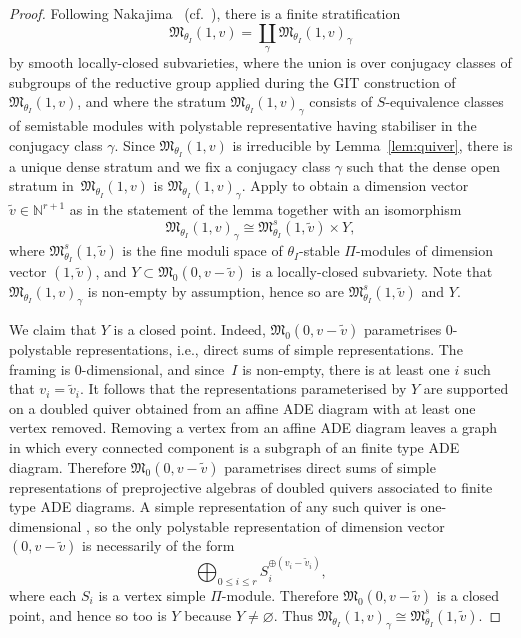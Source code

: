 \documentclass[11pt]{article}
\numberwithin{equation}{section}
\numberwithin{equation}{section}
\begin{document}
\begin{proof}
 Following Nakajima~\cite[Section 6]{nakajima1994instantons} (cf.\ \cite[Section 3.5]{bellamy2020birational}),
 there is a finite stratification
\begin{equation*}
\mathfrak{M}_{\theta_I}(1,v) = \coprod_{\gamma} \mathfrak{M}_{\theta_I}(1,v)_{\gamma} \end{equation*}
by smooth locally-closed subvarieties, where the union is over conjugacy classes of subgroups of the reductive group applied during the GIT construction of $\mathfrak{M}_{\theta_I}(1,v)$, and where the stratum $\mathfrak{M}_{\theta_I}(1,v)_{\gamma}$ consists of $S$-equivalence classes of semistable modules with polystable representative having stabiliser in the conjugacy class $\gamma$. Since $\mathfrak{M}_{\theta_I}(1,v)$ is irreducible by Lemma~\ref{lem:quiver}, there is a unique dense stratum and we fix a conjugacy class $\gamma$
 such that the dense open stratum in~$\mathfrak{M}_{\theta_I}(1,v)$ is $\mathfrak{M}_{\theta_I}(1,v)_\gamma$. Apply \cite[Proposition 2.25]{nakajima2009quiver} to obtain a dimension vector $\widetilde{v}\in \mathbb{N}^{r+1}$ as in the statement of the lemma
 together with an isomorphism
\begin{equation} \label{eqn:gammaIsom}
\mathfrak{M}_{\theta_I}(1,v)_{\gamma} \cong \mathfrak{M}^s_{\theta_I}(1,\widetilde{v}) \times {Y},
\end{equation}
 where $\mathfrak{M}^s_{\theta_I}(1,\widetilde{v})$ is the fine moduli space of $\theta_I$-stable $\Pi$-modules of dimension vector $(1,\widetilde{v})$, and ${Y} \subset \mathfrak{M}_{0}(0,v-\widetilde{v})$ is a locally-closed subvariety.
 Note that $\mathfrak{M}_{\theta_I}(1,v)_{\gamma}$ is non-empty by assumption, hence so are $\mathfrak{M}^s_{\theta_I}(1,\widetilde{v})$ and ${Y}$.

 We claim that ${Y}$ is a closed point. Indeed, $\mathfrak{M}_0(0, v-\widetilde{v})$ parametrises
 0-polystable representations, i.e., direct sums of simple representations. The framing is 0-dimensional,
and since~$I$ is non-empty, there is at least one $i$ such that $v_i = \widetilde{v}_i$. It follows that the representations parameterised by ${Y}$
are supported on a doubled quiver obtained from an affine ADE diagram with at least one vertex removed. Removing a vertex from an affine ADE diagram leaves a graph in which every connected component is a subgraph of an finite type ADE diagram. Therefore $\mathfrak{M}_0(0, v-\widetilde{v})$ parametrises direct sums of simple representations of preprojective algebras of doubled quivers associated to finite type ADE diagrams. A simple representation of any such quiver is one-dimensional \cite[Lemma~2.2]{savage2011quiver}, so the only polystable representation of dimension vector $(0, v-\widetilde{v})$ is
necessarily of the form
\begin{equation}\label{eqn:directsumsimples}
\bigoplus_{0\leq i\leq r}S_i^{\oplus(v_i-\tilde{v}_i)},
\end{equation}
where each $S_i$ is a vertex simple $\Pi$-module. Therefore $\mathfrak{M}_0(0, v-\widetilde{v})$ is a closed point, and hence so too is ${Y}$ because ${Y}\neq \varnothing$. Thus $\mathfrak{M}_{\theta_I}(1,v)_{\gamma} \cong \mathfrak{M}^s_{\theta_I}(1,\widetilde{v})$.


\end{proof}
\end{document}
